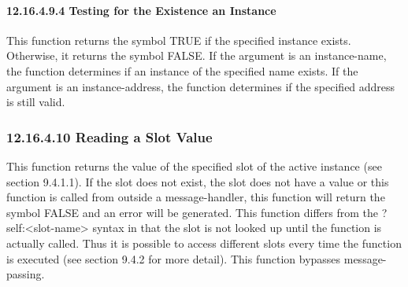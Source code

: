 \documentclass[letterpaper,10pt,english]{sphinxmanual}
\begin{document}
\paragraph{12.16.4.9.4 Testing for the Existence an Instance}
\label{\detokenize{actions:testing-for-the-existence-an-instance}}
This function returns the symbol TRUE if the specified instance exists.
Otherwise, it returns the symbol FALSE. If the argument is an
instance-name, the function determines if an instance of the specified
name exists. If the argument is an instance-address, the function
determines if the specified address is still valid.


\begin{sphinxVerbatim}[commandchars=\\\{\}]
 
\end{sphinxVerbatim}


\subsubsection{12.16.4.10 Reading a Slot Value}
\label{\detokenize{actions:reading-a-slot-value}}
This function returns the value of the specified slot of the active
instance (see section 9.4.1.1). If the slot does not exist, the slot
does not have a value or this function is called from outside a
message-handler, this function will return the symbol FALSE and an error
will be generated. This function differs from the ?self:\textless{}slot-name\textgreater{}
syntax in that the slot is not looked up until the function is actually
called. Thus it is possible to access different slots every time the
function is executed (see section 9.4.2 for more detail). This function
bypasses message-passing.


\begin{sphinxVerbatim}[commandchars=\\\{\}]
 
\end{sphinxVerbatim}
\end{document}
